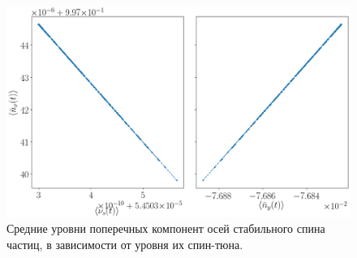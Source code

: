 \begin{figure}[H]\centering
	\includegraphics[height=.35\paperheight]{images/decoh_sim/mean_n_bar_vs_spin_tune}
	\caption{Средние уровни поперечных компонент осей стабильного спина частиц, в зависимости от уровня их спин-тюна.\label{decoh:fig:nbar_vs_ST}}
\end{figure}

